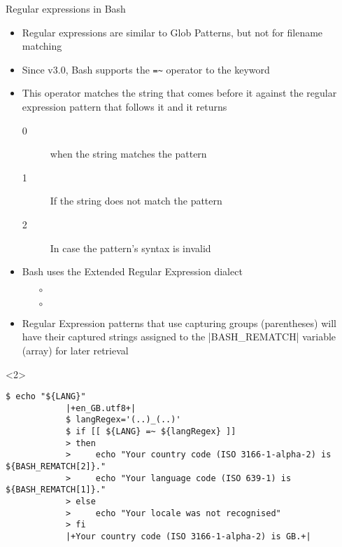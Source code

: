 \begin{frame}[fragile]{Regular expressions in Bash}
    \begin{itemize}[<only@1>]
        \item Regular expressions are similar to Glob Patterns, but not for filename matching
        \item Since v3.0, Bash supports the \texttt{=\textasciitilde} operator to the \bash{[[} keyword
        \item This operator matches the string that comes before it against the regular expression pattern that follows it and it returns
              \begin{description}
                  \item[0] when the string matches the pattern
                  \item[1] If the string does not match the pattern
                  \item[2] In case the pattern's syntax is invalid
              \end{description}
        \item Bash uses the Extended Regular Expression dialect
              \begin{itemize}
                  \item[$\circ$] 
                  \item[$\circ$] 
              \end{itemize}
        \item Regular Expression patterns that use capturing groups (parentheses) will have their captured strings assigned to the \bash|BASH_REMATCH| variable (array) for later retrieval
    \end{itemize}
    \begin{onlyenv}<2>
        \begin{lstlisting}[style=MyBash, style=oddnumbers, style=smaller]
            $ echo "${LANG}"
            |+en_GB.utf8+|
            $ langRegex='(..)_(..)'
            $ if [[ ${LANG} =~ ${langRegex} ]]
            > then
            >     echo "Your country code (ISO 3166-1-alpha-2) is ${BASH_REMATCH[2]}."
            >     echo "Your language code (ISO 639-1) is ${BASH_REMATCH[1]}."
            > else
            >     echo "Your locale was not recognised"
            > fi
            |+Your country code (ISO 3166-1-alpha-2) is GB.+|

\end{lstlisting}
\end{onlyenv}
\end{frame}

